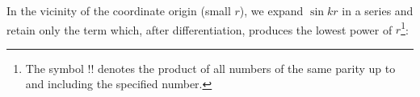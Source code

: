 In the vicinity of the coordinate origin (small $r$), we expand $\sin kr$ in a
series and retain only the term which, after differentiation, produces the
lowest power of $r$\footnote{The symbol $!!$ denotes the product of all numbers
of the same parity up to and including the specified number.}:
